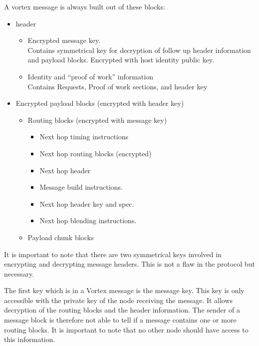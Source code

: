 A vortex message is always built out of these blocks:
\begin{itemize}
	\item header
	\begin{itemize}
		\item Encrypted message key.\\
			  Contains symmetrical key for decryption of follow up header information and payload blocks. Encrypted with host identity public key.
		\item Identity and ``proof of work'' information\\
		      Contains Requests, Proof of work sections, and header key
	\end{itemize}
	\item Encrypted payload blocks (encrypted with header key)
	\begin{itemize}
		\item Routing blocks (encrypted with message key)
		\begin{itemize}
			\item Next hop timing instructions
			\item Next hop routing blocks (encrypted)
			\item Next hop header
			\item Message build instructions.
			\item Next hop header key and spec.
			\item Next hop blending instructions.
		\end{itemize}
		\item Payload chunk blocks
	\end{itemize}
\end{itemize}

It is important to note that there are two symmetrical keys involved in encrypting and decrypting message headers. This is not a flaw in the protocol but necessary. 

The first key which is in a Vortex message is the message key. This key is only accessible with the private key of the node receiving the message. It allows decryption of the routing blocks and the header information. The sender of a message block is therefore not able to tell if a message contains one or more routing blocks. It is important to note that no other node should have access to this information. 

